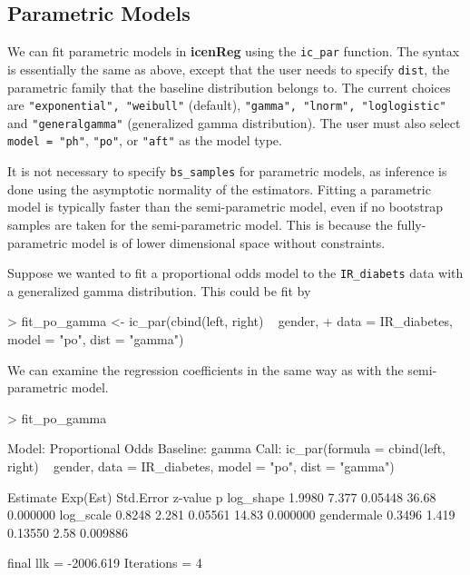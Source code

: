 \documentclass[a4paper]{article}
\begin{document}
\subsection{Parametric Models}
  
We can fit parametric models in {\bf icenReg} using the \texttt{ic\_par} function. The syntax is essentially the same as above, except that the user needs to specify \texttt{dist}, the parametric family that the baseline distribution belongs to. The current choices are \texttt{"exponential", "weibull"} (default), \texttt{"gamma", "lnorm", "loglogistic"} and \texttt{"generalgamma"} (generalized gamma distribution). The user must also select \texttt{model = "ph"},  \texttt{"po"}, or \texttt{"aft"} as the model type. 
  
It is not necessary to specify \texttt{bs\_samples} for parametric models, as inference is done using the asymptotic normality of the estimators. Fitting a parametric model is typically faster than the semi-parametric model, even if no bootstrap samples are taken for the semi-parametric model. This is because the fully-parametric model is of lower dimensional space without constraints. 
  
Suppose we wanted to fit a proportional odds model to the \texttt{IR\_diabets} data with a generalized gamma distribution. This could be fit by
  
\begin{Schunk}
\begin{Sinput}
> fit_po_gamma <- ic_par(cbind(left, right) ~ gender,
+     data = IR_diabetes, model = "po", dist = "gamma")
\end{Sinput}
\end{Schunk}

  We can examine the regression coefficients in the same way as with the semi-parametric model.
  

\begin{Schunk}
\begin{Sinput}
> fit_po_gamma
\end{Sinput}
\begin{Soutput}
Model:  Proportional Odds
Baseline:  gamma 
Call: ic_par(formula = cbind(left, right) ~ gender, data = IR_diabetes, 
    model = "po", dist = "gamma")

           Estimate Exp(Est) Std.Error z-value        p
log_shape    1.9980    7.377   0.05448   36.68 0.000000
log_scale    0.8248    2.281   0.05561   14.83 0.000000
gendermale   0.3496    1.419   0.13550    2.58 0.009886

final llk =  -2006.619 
Iterations =  4 
\end{Soutput}
\end{Schunk}
\end{document}
